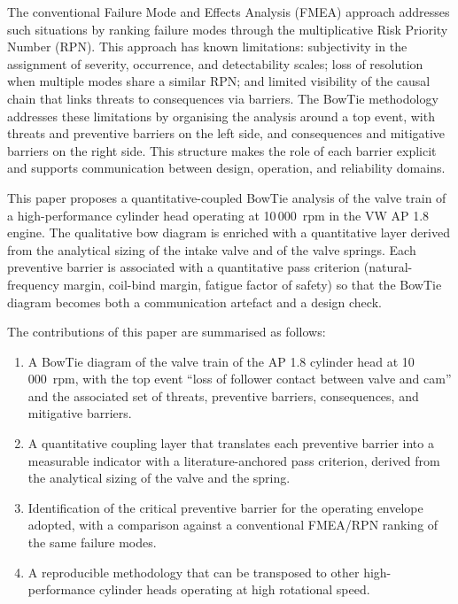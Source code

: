 The conventional Failure Mode and Effects Analysis (FMEA) approach
addresses such situations by ranking failure modes through the
multiplicative Risk Priority Number (RPN). This approach has known
limitations: subjectivity in the assignment of severity, occurrence, and
detectability scales; loss of resolution when multiple modes share a
similar RPN; and limited visibility of the causal chain that links
threats to consequences via barriers. The BowTie methodology addresses
these limitations by organising the analysis around a top event, with
threats and preventive barriers on the left side, and consequences and
mitigative barriers on the right side. This structure makes the role of
each barrier explicit and supports communication between design,
operation, and reliability domains.

This paper proposes a quantitative-coupled BowTie analysis of the valve
train of a high-performance cylinder head operating at 10\,000~rpm in the
VW AP 1.8 engine. The qualitative bow diagram is enriched with a
quantitative layer derived from the analytical sizing of the intake
valve and of the valve springs. Each preventive barrier is associated
with a quantitative pass criterion (natural-frequency margin, coil-bind
margin, fatigue factor of safety) so that the BowTie diagram becomes both
a communication artefact and a design check.

The contributions of this paper are summarised as follows:
\begin{enumerate}
\item A BowTie diagram of the valve train of the AP 1.8 cylinder head at
10\,000~rpm, with the top event ``loss of follower contact between valve
and cam'' and the associated set of threats, preventive barriers,
consequences, and mitigative barriers.
\item A quantitative coupling layer that translates each preventive
barrier into a measurable indicator with a literature-anchored pass
criterion, derived from the analytical sizing of the valve and the
spring.
\item Identification of the critical preventive barrier for the operating
envelope adopted, with a comparison against a conventional FMEA/RPN
ranking of the same failure modes.
\item A reproducible methodology that can be transposed to other
high-performance cylinder heads operating at high rotational speed.
\end{enumerate}

